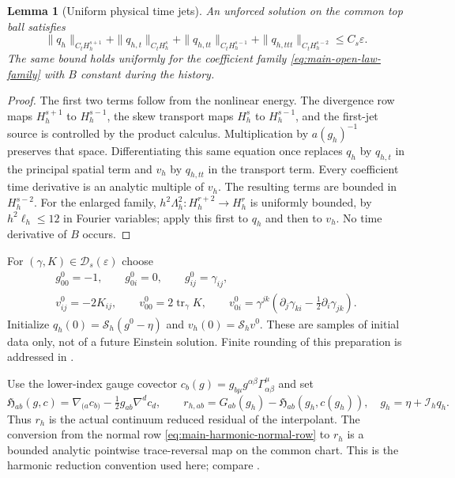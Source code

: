 \documentclass[11pt]{article}
\numberwithin{equation}{section}
\newtheorem{lemma}[lemma]{Lemma}
\theoremstyle{definition}
\theoremstyle{remark}
\newcommand{\tr}{\operatorname{tr}}
\begin{document}
\begin{lemma}[Uniform physical time jets]
\label{lem:supp-open-time-jets}
An unforced solution on the common top ball satisfies
\begin{equation}
 \|q_h\|_{C_tH_h^{s+1}}+\|q_{h,t}\|_{C_tH_h^s}
 +\|q_{h,tt}\|_{C_tH_h^{s-1}}
 +\|q_{h,ttt}\|_{C_tH_h^{s-2}}\le C_s\varepsilon.
 \label{eq:supp-open-time-jet-bound}
\end{equation}
The same bound holds uniformly for the coefficient family
\eqref{eq:main-open-law-family} with $B$ constant during the history.
\end{lemma}
\begin{proof}
The first two terms follow from the nonlinear energy.  The divergence row
maps $H_h^{s+1}$ to $H_h^{s-1}$, the skew transport maps $H_h^s$ to
$H_h^{s-1}$, and the first-jet source is controlled by the product calculus.
Multiplication by $a(g_h)^{-1}$ preserves that space.  Differentiating this
same equation once replaces $q_h$ by $q_{h,t}$ in the principal spatial
term and $v_h$ by $q_{h,tt}$ in the transport term.  Every coefficient time
derivative is an analytic multiple of $v_h$.  The resulting terms are
bounded in $H_h^{s-2}$.  For the enlarged family,
$h^2\Lambda_h^2:H_h^{r+2}\to H_h^r$ is uniformly bounded, by
$h^2\ell_h\le12$ in Fourier variables; apply this first to $q_h$ and then
to $v_h$.  No time derivative of $B$ occurs.
\end{proof}

For $(\gamma,K)\in\mathcal D_s(\varepsilon)$ choose
\begin{equation}
 \begin{gathered}
 g_{00}^0=-1,\qquad g_{0i}^0=0,\qquad g_{ij}^0=\gamma_{ij},\\
 v_{ij}^0=-2K_{ij},\qquad v_{00}^0=2\tr_\gamma K,\qquad
 v_{0i}^0=\gamma^{jk}(\partial_j\gamma_{ki}
                         -\tfrac12\partial_i\gamma_{jk}).
 \end{gathered}
 \label{eq:supp-open-harmonic-initial}
\end{equation}
Initialize $q_h(0)=\mathcal S_h(g^0-\eta)$ and
$v_h(0)=\mathcal S_hv^0$.  These are samples of initial data only, not of a
future Einstein solution.  Finite rounding of this preparation is addressed
in .

Use the lower-index gauge covector
$c_b(g)=g_{b\mu}g^{\alpha\beta}\Gamma^\mu_{\alpha\beta}$ and set
\begin{equation}
 \mathfrak H_{ab}(g,c)=\nabla_{(a}c_{b)}
                   -\tfrac12g_{ab}\nabla^dc_d,
 \qquad r_{h,ab}=G_{ab}(g_h)-\mathfrak H_{ab}(g_h,c(g_h)),
 \quad g_h=\eta+\mathcal I_hq_h.
 \label{eq:supp-open-reduced-residual}
\end{equation}
Thus $r_h$ is the actual continuum reduced residual of the interpolant.
The conversion from the normal row
\eqref{eq:main-harmonic-normal-row} to $r_h$ is a bounded analytic
pointwise trace-reversal map on the common chart.  This is the harmonic
reduction convention used here; compare \cite[Sec.~2.1]{Lindblom2006}.
\end{document}
